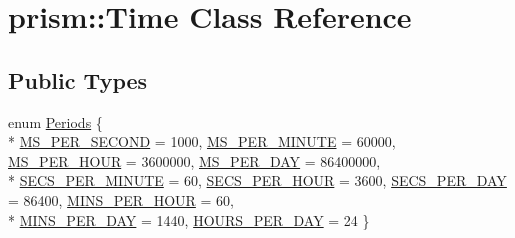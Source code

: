 \hypertarget{classprism_1_1_time}{}\section{prism\+:\+:Time Class Reference}
\label{classprism_1_1_time}
\subsection*{Public Types}
\begin{DoxyCompactItemize}
\item 
enum \hyperlink{classprism_1_1_time_abad93f9bcf24f92363779ceea634fba1}{Periods} \{ \\*
\hyperlink{classprism_1_1_time_abad93f9bcf24f92363779ceea634fba1a936aeb84b0e60cf062adb25a35cf2fda}{M\+S\+\_\+\+P\+E\+R\+\_\+\+S\+E\+C\+O\+ND} = 1000, 
\hyperlink{classprism_1_1_time_abad93f9bcf24f92363779ceea634fba1a91c834280bbe9c6ce2ea438f0132ca60}{M\+S\+\_\+\+P\+E\+R\+\_\+\+M\+I\+N\+U\+TE} = 60000, 
\hyperlink{classprism_1_1_time_abad93f9bcf24f92363779ceea634fba1aed67b9c928af60c5cad839b71253ad1c}{M\+S\+\_\+\+P\+E\+R\+\_\+\+H\+O\+UR} = 3600000, 
\hyperlink{classprism_1_1_time_abad93f9bcf24f92363779ceea634fba1aab960bfe4c84e6bd79bd4fd5b038bffd}{M\+S\+\_\+\+P\+E\+R\+\_\+\+D\+AY} = 86400000, 
\\*
\hyperlink{classprism_1_1_time_abad93f9bcf24f92363779ceea634fba1a0e58469de7dd0d126a53b68db3e35ee0}{S\+E\+C\+S\+\_\+\+P\+E\+R\+\_\+\+M\+I\+N\+U\+TE} = 60, 
\hyperlink{classprism_1_1_time_abad93f9bcf24f92363779ceea634fba1a43bac766fad2dce180ae4fff8a66441f}{S\+E\+C\+S\+\_\+\+P\+E\+R\+\_\+\+H\+O\+UR} = 3600, 
\hyperlink{classprism_1_1_time_abad93f9bcf24f92363779ceea634fba1a73e1d097f17207730eb6935270e05c05}{S\+E\+C\+S\+\_\+\+P\+E\+R\+\_\+\+D\+AY} = 86400, 
\hyperlink{classprism_1_1_time_abad93f9bcf24f92363779ceea634fba1a3f4160b1bb1b56fbd23f53e614bd0bad}{M\+I\+N\+S\+\_\+\+P\+E\+R\+\_\+\+H\+O\+UR} = 60, 
\\*
\hyperlink{classprism_1_1_time_abad93f9bcf24f92363779ceea634fba1a890a5f1d86e152fc8c5d3ca4b6673207}{M\+I\+N\+S\+\_\+\+P\+E\+R\+\_\+\+D\+AY} = 1440, 
\hyperlink{classprism_1_1_time_abad93f9bcf24f92363779ceea634fba1a2321329da5265ab087381f8c0483403e}{H\+O\+U\+R\+S\+\_\+\+P\+E\+R\+\_\+\+D\+AY} = 24
 \}
\end{DoxyCompactItemize}
